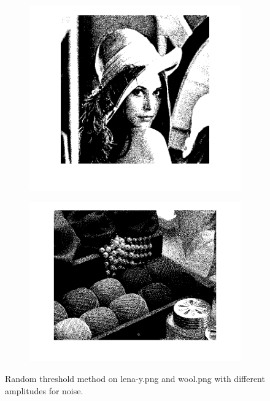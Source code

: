 \documentclass{article}
\begin{document}
 \begin{figure}
        \centering
        \begin{subfigure}[b]{0.49\textwidth}
            \includegraphics[width=\textwidth]{Images/lena_rand_thresh.png}
        \end{subfigure}
        \begin{subfigure}[b]{0.49\textwidth}
            \includegraphics[width=\textwidth]{Images/wool_rnd_thresh.png}
        \end{subfigure}
        \caption{Random threshold method on \textsf{lena-y.png} and \textsf{wool.png} with different amplitudes for noise.}
        \label{fig:rand_thresh}
\end{figure}
\end{document}
